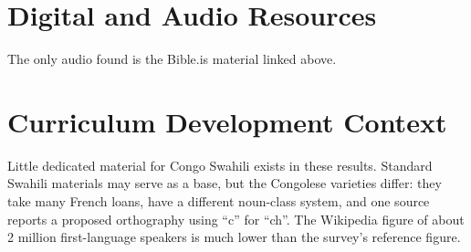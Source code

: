 \documentclass[12pt]{article}
\begin{document}
\section{Digital and Audio Resources}
The only audio found is the Bible.is material linked above.

\section{Curriculum Development Context}
Little dedicated material for Congo Swahili exists in these results. Standard Swahili materials may serve as a base, but the Congolese varieties differ: they take many French loans, have a different noun-class system, and one source reports a proposed orthography using ``c'' for ``ch''. The Wikipedia figure of about 2 million first-language speakers is much lower than the survey's reference figure.
\end{document}
